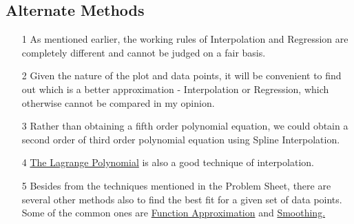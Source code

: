 \documentclass[titlepage, 11pt]{article}
\begin{document}
\subsection{Alternate Methods}
\begin{itemize}
    \item [1] As mentioned earlier, the working rules of Interpolation and Regression are completely different and cannot be judged on a fair basis.
    \item [2] Given the nature of the plot and data points, it will be convenient to find out which is a better approximation - Interpolation or Regression, which otherwise cannot be compared in my opinion.
    \item [3] Rather than obtaining a fifth order polynomial equation, we could obtain a second order of third order polynomial equation using Spline Interpolation. 
    \item [4] \href{https://en.wikipedia.org/wiki/Lagrange_polynomial}{The Lagrange Polynomial} is also a good technique of interpolation. 
    \item [5] Besides from the techniques mentioned in the Problem Sheet, there are several other methods also to find the best fit for a given set of data points. Some of the common ones are \href{https://en.wikipedia.org/wiki/Function_approximation}{Function Approximation} and \href{https://en.wikipedia.org/wiki/Smoothing}{Smoothing.}
\end{itemize}
\end{document}
